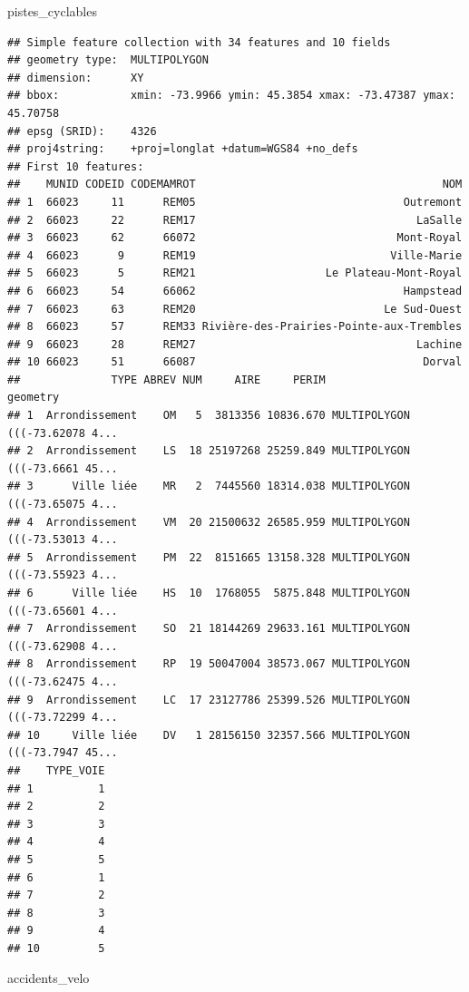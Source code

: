 \documentclass[]{article}
\newenvironment{Shaded}{\begin{snugshade}}{\end{snugshade}}
\newcommand{\NormalTok}[1]{#1}
\begin{document}
\begin{Shaded}
\begin{Highlighting}[]
\NormalTok{pistes_cyclables}
\end{Highlighting}
\end{Shaded}

\begin{verbatim}
## Simple feature collection with 34 features and 10 fields
## geometry type:  MULTIPOLYGON
## dimension:      XY
## bbox:           xmin: -73.9966 ymin: 45.3854 xmax: -73.47387 ymax: 45.70758
## epsg (SRID):    4326
## proj4string:    +proj=longlat +datum=WGS84 +no_defs
## First 10 features:
##    MUNID CODEID CODEMAMROT                                      NOM
## 1  66023     11      REM05                                Outremont
## 2  66023     22      REM17                                  LaSalle
## 3  66023     62      66072                               Mont-Royal
## 4  66023      9      REM19                              Ville-Marie
## 5  66023      5      REM21                    Le Plateau-Mont-Royal
## 6  66023     54      66062                                Hampstead
## 7  66023     63      REM20                             Le Sud-Ouest
## 8  66023     57      REM33 Rivière-des-Prairies-Pointe-aux-Trembles
## 9  66023     28      REM27                                  Lachine
## 10 66023     51      66087                                   Dorval
##              TYPE ABREV NUM     AIRE     PERIM                       geometry
## 1  Arrondissement    OM   5  3813356 10836.670 MULTIPOLYGON (((-73.62078 4...
## 2  Arrondissement    LS  18 25197268 25259.849 MULTIPOLYGON (((-73.6661 45...
## 3      Ville liée    MR   2  7445560 18314.038 MULTIPOLYGON (((-73.65075 4...
## 4  Arrondissement    VM  20 21500632 26585.959 MULTIPOLYGON (((-73.53013 4...
## 5  Arrondissement    PM  22  8151665 13158.328 MULTIPOLYGON (((-73.55923 4...
## 6      Ville liée    HS  10  1768055  5875.848 MULTIPOLYGON (((-73.65601 4...
## 7  Arrondissement    SO  21 18144269 29633.161 MULTIPOLYGON (((-73.62908 4...
## 8  Arrondissement    RP  19 50047004 38573.067 MULTIPOLYGON (((-73.62475 4...
## 9  Arrondissement    LC  17 23127786 25399.526 MULTIPOLYGON (((-73.72299 4...
## 10     Ville liée    DV   1 28156150 32357.566 MULTIPOLYGON (((-73.7947 45...
##    TYPE_VOIE
## 1          1
## 2          2
## 3          3
## 4          4
## 5          5
## 6          1
## 7          2
## 8          3
## 9          4
## 10         5
\end{verbatim}

\begin{Shaded}
\begin{Highlighting}[]
\NormalTok{accidents_velo}
\end{Highlighting}
\end{Shaded}
\end{document}
